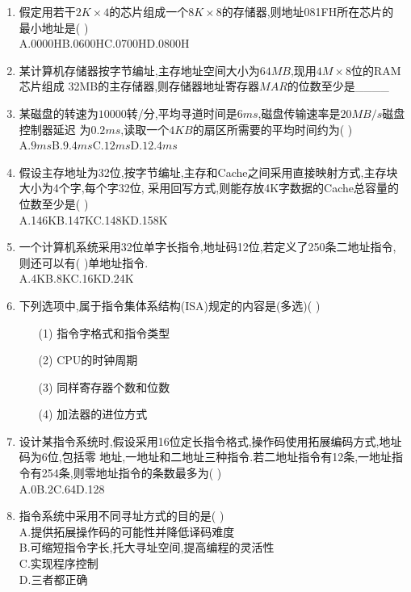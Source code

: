 \documentclass[12pt, a4paper, oneside, UTF8]{ctexbook}
\begin{document}
\begin{enumerate}
    \item \bt 假定用若干$2K\times 4$的芯片组成一个$8K\times 8$的存储器,则地址081FH所在芯片的
    最小地址是(    ) \\
    A.0000H\qquad B.0600H\qquad C.0700H\qquad D.0800H 

    \item \bt 某计算机存储器按字节编址,主存地址空间大小为$64MB$,现用$4M\times 8$位的RAM芯片组成
    32MB的主存储器,则存储器地址寄存器$MAR$的位数至少是\_\_\_\_ 

    \item \bt 某磁盘的转速为$10000$转/分,平均寻道时间是$6ms$,磁盘传输速率是$20MB/s$磁盘控制器延迟
    为$0.2ms$,读取一个$4KB$的扇区所需要的平均时间约为(   ) \\
    A.$9ms$\qquad B.$9.4ms$\qquad C.$12ms$\qquad D.$12.4ms$

    \item \bt 假设主存地址为32位,按字节编址,主存和Cache之间采用直接映射方式,主存块大小为4个字,每个字32位,
    采用回写方式,则能存放4K字数据的Cache总容量的位数至少是(   ) \\
    A.146K\qquad B.147K\qquad C.148K\qquad D.158K 

    \item \bl 一个计算机系统采用32位单字长指令,地址码12位,若定义了250条二地址指令,则还可以有(   )单地址指令. \\
    A.4K\qquad B.8K\qquad C.16K\qquad D.24K 

    \item \bt 下列选项中,属于指令集体系结构(ISA)规定的内容是(多选)(    )
    \begin{enumerate}
        \item [(1)] 指令字格式和指令类型 
        \item [(2)] CPU的时钟周期 
        \item [(3)] 同样寄存器个数和位数 
        \item [(4)] 加法器的进位方式
    \end{enumerate}

    \item \bt 设计某指令系统时,假设采用16位定长指令格式,操作码使用拓展编码方式,地址码为6位,包括零
    地址,一地址和二地址三种指令.若二地址指令有12条,一地址指令有254条,则零地址指令的条数最多为(   )\\
    A.0\qquad B.2\qquad C.64\qquad D.128

    \item 指令系统中采用不同寻址方式的目的是(   )\\
    A.提供拓展操作码的可能性并降低译码难度 \\
    B.可缩短指令字长,托大寻址空间,提高编程的灵活性 \\
    C.实现程序控制 \\
    D.三者都正确 


\end{enumerate}
\end{document}
